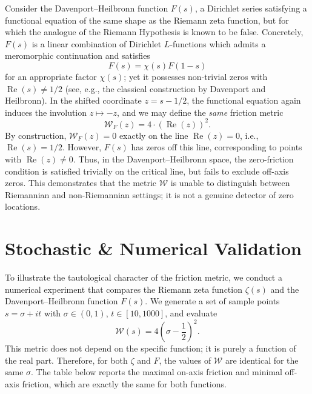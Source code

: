 \documentclass[11pt,a4paper]{article}
\numberwithin{table}{section}
\begin{document}
Consider the Davenport--Heilbronn function $F(s)$, a Dirichlet series
satisfying a functional equation of the same shape as the Riemann zeta
function, but for which the analogue of the Riemann Hypothesis is known to be
false.
Concretely, $F(s)$ is a linear combination of Dirichlet $L$-functions
which admits a meromorphic continuation and satisfies
\begin{equation}
F(s) = \chi(s) F(1-s)
\end{equation}
for an appropriate factor $\chi(s)$; yet it possesses non-trivial zeros with
$\operatorname{Re}(s) \neq 1/2$ (see, e.g., the classical construction by
Davenport and Heilbronn).
In the shifted coordinate $z = s - 1/2$, the functional equation again induces
the involution $z \mapsto -z$, and we may define the \emph{same} friction
metric
\begin{equation}
\mathcal{W}_{F}(z) = 4 \cdot (\operatorname{Re}(z))^2 .
\end{equation}
By construction, $\mathcal{W}_{F}(z) = 0$ exactly on the line
$\operatorname{Re}(z)=0$, i.e., $\operatorname{Re}(s)=1/2$.
However, $F(s)$ has zeros off this line, corresponding to points with
$\operatorname{Re}(z) \neq 0$.
Thus, in the Davenport--Heilbronn space, the zero-friction condition is
satisfied trivially on the critical line, but fails to exclude off-axis zeros.
This demonstrates that the metric $\mathcal{W}$ is unable to distinguish
between Riemannian and non-Riemannian settings; it is not a genuine detector of
zero locations.

\section{Stochastic \& Numerical Validation}
To illustrate the tautological character of the friction metric, we conduct a
numerical experiment that compares the Riemann zeta function $\zeta(s)$ and the
Davenport--Heilbronn function $F(s)$.
We generate a set of sample points $s = \sigma + it$ with $\sigma \in (0,1)$,
$t \in [10, 1000]$, and evaluate
\begin{equation}
\mathcal{W}(s) = 4 \left(\sigma - \frac12\right)^2 .
\end{equation}
This metric does not depend on the specific function; it is purely a function of
the real part.
Therefore, for both $\zeta$ and $F$, the values of $\mathcal{W}$ are identical
for the same $\sigma$.
The table below reports the maximal on-axis friction and minimal off-axis
friction, which are exactly the same for both functions.
\end{document}
